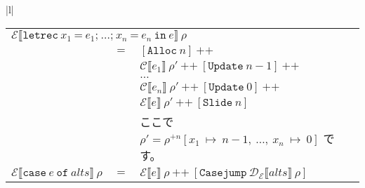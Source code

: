 \documentclass{jarticle}
\begin{document}
\begin{tabular} {|l|}
\begin{tabular}{r c l}
		\multicolumn{3}{l}{$\mathcal{E} \llbracket \texttt{letrec} ~ x_1 ~ \texttt{=} ~ e_1\texttt{;} ~  \ldots \texttt{;} ~ x_n ~ \texttt{=} ~ e_n ~ \texttt{in} ~ e \rrbracket ~ \rho$}                                                                                                                               \\
		                                                                                                           & $=$ & $\left[\texttt{Alloc} ~ n\right] ~ \texttt{++}$                                                                                                                                              \\
		                                                                                                           &     & $\mathcal{C} \llbracket e_1 \rrbracket ~ \rho' ~ \texttt{++} ~ \left[\texttt{Update} ~ n - 1\right] ~ \texttt{++}$                                                                           \\
		                                                                                                           &     & $\ldots$                                                                                                                                                                                     \\
		                                                                                                           &     & $\mathcal{C} \llbracket e_n \rrbracket ~ \rho' ~ \texttt{++} ~ \left[\texttt{Update} ~ 0\right] ~ \texttt{++}$                                                                               \\
		                                                                                                           &     & $\mathcal{E} \llbracket e \rrbracket ~ \rho' ~ \texttt{++} ~ \left[\texttt{Slide} ~ n\right]$                                                                                                \\
		                                                                                                           &     & ここで $\rho' = \rho^{+n} \left[x_1 ~ \mapsto ~ n - 1, ~ \ldots , ~ x_n ~ \mapsto ~ 0\right]$ です。                                                                                         \\
		$\mathcal{E} \llbracket \texttt{case} ~ e ~ \texttt{of} ~ alts \rrbracket ~ \rho$                          & $=$ & $\mathcal{E} \llbracket e \rrbracket ~ \rho ~ \texttt{++} ~ \left[\texttt{Casejump} ~ \mathcal{D_E} \llbracket alts \rrbracket ~ \rho \right]$                                               \\

\end{tabular}
\end{tabular}
\end{document}
